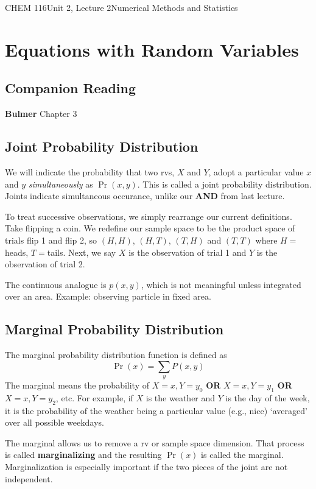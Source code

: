 \documentclass{article}
\begin{document}
\begin{tdoc}{CHEM 116}{Unit 2, Lecture 2}{Numerical Methods and Statistics}

  \section{Equations with Random Variables}

  \subsection*{Companion Reading}
  \textbf{Bulmer} Chapter 3

\subsection{Joint Probability Distribution}
We will indicate the probability that two rvs, $X$ and $Y$, adopt a
particular value $x$ and $y$ \emph{simultaneously} as $\Pr(x,y)$. This
is called a joint probability distribution. Joints indicate
simultaneous occurance, unlike our {\bf AND} from last lecture.

To treat successive observations, we simply rearrange our current
definitions. Take flipping a coin. We redefine our sample space to be
the product space of trials flip 1 and flip 2, so $(H,H)$, $(H,T)$,
$(T,H)$ and $(T,T)$ where $H=$heads, $T=$tails. Next, we say $X$ is the
observation of trial 1 and $Y$ is the observation of trial 2.

The continuous analogue is $p(x,y)$, which is not meaningful unless
integrated over an area. Example: observing particle in fixed area.

\subsection{Marginal Probability Distribution}
The marginal probability distribution function is defined as
\begin{equation}
\Pr(x) = \sum_y P(x,y)
\end{equation}
The marginal means the probability of $X=x, Y=y_0$ \textbf{OR} $X=x, Y=y_1$ \textbf{OR}
$X=x, Y=y_2$, etc. For example, if $X$ is the weather and $Y$ is the
day of the week, it is the probability of the weather being a particular value (e.g., nice) `averaged' over
all possible weekdays.

The marginal allows us to remove a rv or sample space dimension. That
process is called {\bf marginalizing} and the resulting $\Pr(x)$ is
called the marginal. Marginalization is especially important if the two pieces of
the joint are not independent.


\end{tdoc}
\end{document}
